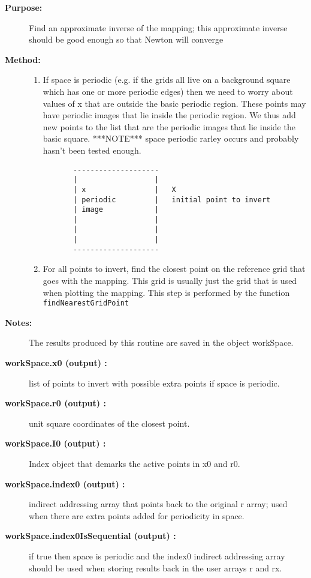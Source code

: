 \begin{description}
\item[{\bf Purpose:}] 
   Find an approximate inverse of the mapping; this approximate inverse
   should be good enough so that Newton will converge

\item[{\bf Method:}]  
 \begin{enumerate}
   \item If space is periodic (e.g. if the grids all live on a background square which has
      one or more periodic edges) then we need to worry about values of x that are outside 
      the basic periodic region. These points may have periodic images that lie inside the
      periodic region. We thus add new points to the list that are the periodic images that
      lie inside the basic square. ***NOTE*** space periodic rarley occurs and probably hasn't
      been tested enough.
 \begin{verbatim}
       --------------------
       |                  |
       | x                |   X
       | periodic         |   initial point to invert
       | image            |
       |                  |
       |                  |
       |                  |
       --------------------
 \end{verbatim}
  \item For all points to invert, find the closest point on the reference grid that goes with
    the mapping. This grid is usually just the grid that is used when plotting the mapping.
     This step is performed by the function {\tt findNearestGridPoint}
 \end{enumerate}

\item[{\bf Notes:}] 
   The results produced by this routine are saved in the object workSpace.
\item[{\bf workSpace.x0 (output) :}]  list of points to invert with possible extra points if space is periodic.
\item[{\bf workSpace.r0 (output) :}]  unit square coordinates of the closest point.
\item[{\bf workSpace.I0 (output) :}]  Index object that demarks the active points in x0 and r0.
\item[{\bf workSpace.index0 (output) :}]  indirect addressing array that points back to the original r array; used
     when there are extra points added for periodicity in space.
\item[{\bf workSpace.index0IsSequential (output) :}]  if true then space is periodic and the index0 indirect addressing
     array should be used when storing results back in the user arrays r and rx.

\end{description}
